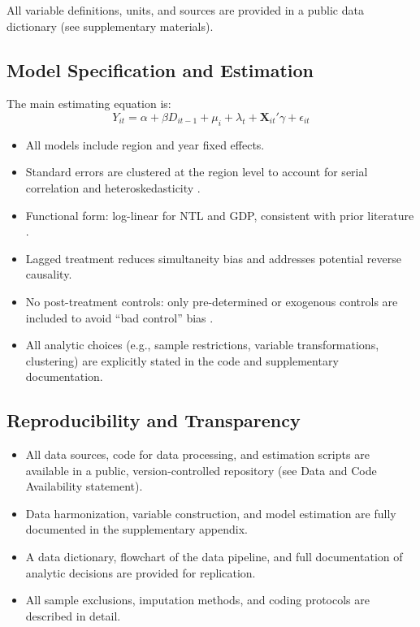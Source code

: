 \documentclass[12pt,a4paper]{article}
\begin{document}
All variable definitions, units, and sources are provided in a public data dictionary (see supplementary materials).

\subsection{Model Specification and Estimation}

The main estimating equation is:
\begin{equation}
Y_{it} = \alpha + \beta D_{it-1} + \mu_i + \lambda_t + \mathbf{X}_{it}'\gamma + \epsilon_{it}
\end{equation}

\begin{itemize}
	\item All models include region and year fixed effects.
	\item Standard errors are clustered at the region level to account for serial correlation and heteroskedasticity \citep{Bertrand2004}.
	\item Functional form: log-linear for NTL and GDP, consistent with prior literature \citep{Henderson2012, Gibson2021}.
	\item Lagged treatment reduces simultaneity bias and addresses potential reverse causality.
	\item No post-treatment controls: only pre-determined or exogenous controls are included to avoid “bad control” bias \citep{Angrist2009}.
	\item All analytic choices (e.g., sample restrictions, variable transformations, clustering) are explicitly stated in the code and supplementary documentation.
\end{itemize}

\subsection{Reproducibility and Transparency}

\begin{itemize}
	\item All data sources, code for data processing, and estimation scripts are available in a public, version-controlled repository (see Data and Code Availability statement).
	\item Data harmonization, variable construction, and model estimation are fully documented in the supplementary appendix.
	\item A data dictionary, flowchart of the data pipeline, and full documentation of analytic decisions are provided for replication.
	\item All sample exclusions, imputation methods, and coding protocols are described in detail.
\end{itemize}
\end{document}
